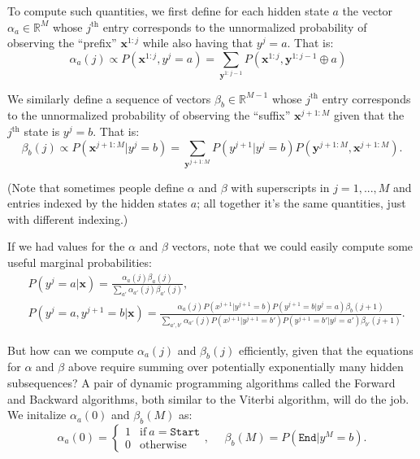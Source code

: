 \documentclass{article}
\newcommand{\x}{\textbf{x}}
\newcommand{\y}{\textbf{y}}
\newcommand{\END}{\texttt{End}}
\begin{document}
To compute such quantities, we first define for each hidden state $a$ the vector $\alpha_a \in \mathbb{R}^M$ whose $j^\text{th}$ entry corresponds to the unnormalized probability of observing the ``prefix'' $\textbf{x}^{1:j}$ while also having that $y^j = a$. That is:
$$\alpha_a(j) \propto P(\x^{1:j},y^j= a) = \sum_{\y^{1:j-1}} P(\x^{1:j}, \y^{1:j-1}\oplus a)\ \ \ $$

We similarly define a sequence of vectors $\beta_b \in \mathbb{R}^{M - 1}$ whose $j^\text{th}$ entry corresponds to the unnormalized probability of observing the ``suffix'' $\textbf{x}^{j+1:M}$ given that the $j^\text{th}$ state is $y^j = b$. That is:
$$\beta_b(j) \propto P(\x^{j+1:M}|y^j=b) = \sum_{\y^{j+1:M}} P(y^{j+1}|y^j=b)P(\y^{j+1:M},\x^{j+1:M}).$$

(Note that sometimes people define $\alpha$ and $\beta$ with superscripts in $j = 1, ..., M$ and entries indexed by the hidden states $a$; all together it's the same quantities, just with different indexing.)

If we had values for the $\alpha$ and $\beta$ vectors, note that we could easily compute some useful marginal probabilities:
\begin{eqnarray}
&P(y^j=a | \x) = \frac{\alpha_a(j)\beta_a(j)}{\sum_{a'} \alpha_{a'}(j)\beta_{a'}(j)},\label{eqn:E_step}\\
&P(y^j=a,y^{j+1}=b | \x) = \frac{\alpha_a(j)P(x^{j+1}|y^{j+1}=b)P(y^{j+1}=b|y^j=a)\beta_b(j+1)}{\sum_{a',b'}\alpha_{a'}(j)P(x^{j+1}|y^{j+1}=b')P(y^{j+1}=b'|y^j=a')\beta_{b'}(j + 1)}.\label{eqn:E_step2}
   \end{eqnarray}

But how can we compute $\alpha_a(j)$ and $\beta_b(j)$ efficiently, given that the equations for $\alpha$ and $\beta$ above require summing over potentially exponentially many hidden subsequences?  A pair of dynamic programming algorithms called the Forward and Backward algorithms, both similar to the Viterbi algorithm, will do the job. 
We initalize $\alpha_a(0)$ and $\beta_b(M)$ as:
$$\alpha_a(0) = \left\{\begin{array}{ll}
1 & \mbox{if}\ a=\texttt{Start}\\
0 & \mbox{otherwise}
\end{array}\right.,
\ \ \ \ \ \ 
\beta_b(M) = P(\END|y^M=b).
$$
\end{document}
